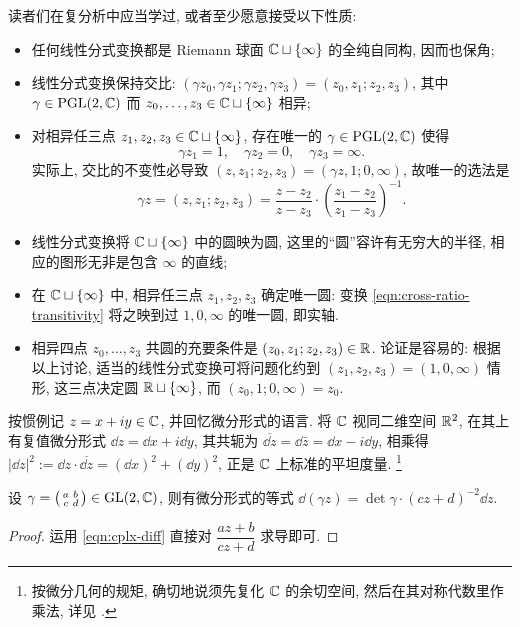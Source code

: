 读者们在复分析中应当学过, 或者至少愿意接受以下性质:
\begin{itemize}
	\item 任何线性分式变换都是 Riemann 球面 $\mathbb{C} \sqcup \{\infty\}$ 的全纯自同构, 因而也保角;
	\item 线性分式变换保持交比: $(\gamma z_0, \gamma z_1; \gamma z_2, \gamma z_3) = (z_0, z_1; z_2, z_3)$, 其中 $\gamma \in \operatorname{PGL}(2,\mathbb{C})$ 而 $z_0, \ldots, z_3 \in \mathbb{C} \sqcup \{\infty\}$ 相异;
	\item 对相异任三点 $z_1, z_2, z_3 \in \mathbb{C} \sqcup \{\infty\}$, 存在唯一的 $\gamma \in \operatorname{PGL}(2,\mathbb{C})$ 使得
	\[ \gamma z_1 = 1, \quad \gamma z_2 = 0, \quad \gamma z_3 = \infty. \]
	实际上, 交比的不变性必导致 $(z, z_1; z_2, z_3) = (\gamma z, 1; 0, \infty)$, 故唯一的选法是
	\begin{equation}\label{eqn:cross-ratio-transitivity}
		\gamma z = (z, z_1; z_2, z_3) = \frac{z - z_2}{z - z_3} \cdot \left(\frac{z_1 - z_2}{z_1 - z_3}\right)^{-1}.
	\end{equation}
	\item 线性分式变换将 $\mathbb{C} \sqcup \{\infty\}$ 中的圆映为圆, 这里的``圆''容许有无穷大的半径, 相应的图形无非是包含 $\infty$ 的直线;
	\item 在 $\mathbb{C} \sqcup \{\infty\}$ 中, 相异任三点 $z_1, z_2, z_3$ 确定唯一圆: 变换 \eqref{eqn:cross-ratio-transitivity} 将之映到过 $1,0,\infty$ 的唯一圆, 即实轴. 
	\item 相异四点 $z_0, \ldots, z_3$ 共圆的充要条件是 $(z_0, z_1; z_2, z_3) \in \mathbb{R}$. 论证是容易的: 根据以上讨论, 适当的线性分式变换可将问题化约到 $(z_1, z_2, z_3) = (1, 0, \infty)$ 情形, 这三点决定圆 $\mathbb{R} \sqcup \{\infty\}$, 而 $(z_0, 1; 0, \infty) = z_0$.
\end{itemize}

按惯例记 $z = x + iy \in \mathbb{C}$, 并回忆微分形式的语言. 将 $\mathbb{C}$ 视同二维空间 $\mathbb{R}^2$, 在其上有复值微分形式 $\dd z = \dd x + i\dd y$, 其共轭为 $\overline{\dd z} = \dd\bar{z} = \dd x - i\dd y$, 相乘得 $|\dd z|^2 := \dd z \cdot \overline{\dd z} = (\dd x)^2 + (\dd y)^2$, 正是 $\mathbb{C}$ 上标准的平坦度量.
\footnote{按微分几何的规矩, 确切地说须先复化 $\mathbb{C}$ 的余切空间, 然后在其对称代数里作乘法, 详见 \cite[\S 7.6]{Li1}.}

\begin{lemma}\label{prop:fractional-transform-d}
	设 $\gamma = \bigl( \begin{smallmatrix} a & b \\ c & d \end{smallmatrix} \bigr) \in \operatorname{GL}(2,\mathbb{C})$, 则有微分形式的等式 $\dd(\gamma z) = \det\gamma \cdot (cz+d)^{-2} \dd z$.
\end{lemma}
\begin{proof}
	运用 \eqref{eqn:cplx-diff} 直接对 $\dfrac{az+b}{cz+d}$ 求导即可.
\end{proof}


